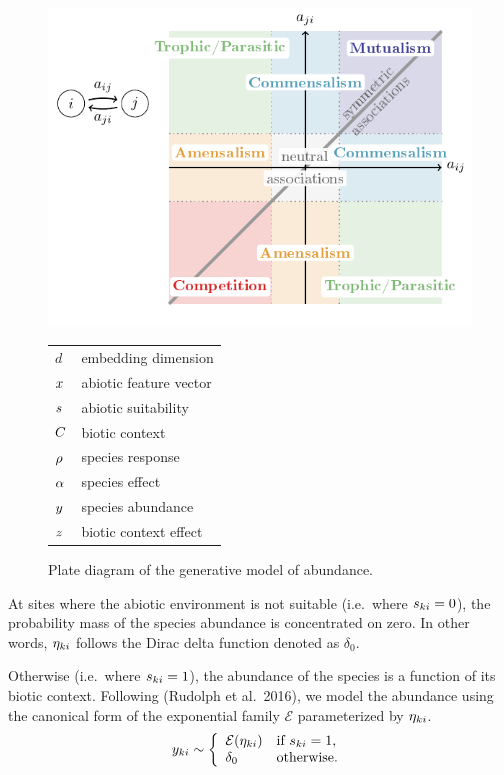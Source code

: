 \documentclass[10pt,a4paper]{article}
\newcommand{\inclPlt}[2]{\includegraphics[page=#1]{tikz_figures.pdf}}
\begin{document}
\begin{figure}[bthp]
  \centering
  \begin{minipage}{0.58\textwidth}
    \inclPlt{3}{schema_plate}
    \end{minipage}
    \begin{minipage}{0.33\textwidth}
    \begin{tabular}{ll}
    \toprule
    $d$ & embedding dimension \\
    $x$ & abiotic feature vector \\
    $s$ & abiotic suitability \\
    $C$ & biotic context \\
    $\rho$ & species response \\
    $\alpha$ & species effect \\
    $y$ & species abundance \\
    $z$ & biotic context effect \\
    \bottomrule
    \end{tabular}
  \end{minipage}
  \caption{Plate diagram of the generative model of abundance.}
  \label{plate}
\end{figure}

At sites where the abiotic environment is not suitable (i.e.\ where $s_{ki} = 0$), the probability mass of the species abundance is concentrated on zero. In other words, $\eta_{ki}$ follows the Dirac delta function denoted as $\delta_0$.

Otherwise (i.e.\ where $s_{ki} = 1$), the abundance of the species is a function of its biotic context. 
Following (Rudolph et al.\ 2016), we model the abundance using the canonical form of the exponential family $\mathcal{E}$ parameterized by $\eta_{ki}$.
\begin{equation*}
y_{ki} \sim \left\{
\begin{array}{ll}
\mathcal{E}(\eta_{ki}) & \mbox{if } s_{ki}=1, \\
\delta_0 & \mbox{otherwise.}\\
\end{array}
\right. \\
\end{equation*}
\end{document}
